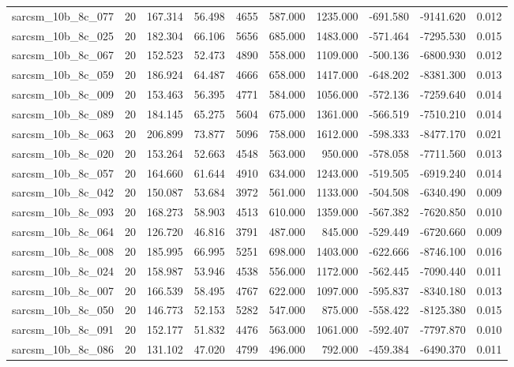 \begin{tabular}{lrrrrrrrrr}
sarcsm\_10b\_8c\_077 & 20 & 167.314 & 56.498 & 4655 & 587.000 & 1235.000 & -691.580 & -9141.620 & 0.012 \\
sarcsm\_10b\_8c\_025 & 20 & 182.304 & 66.106 & 5656 & 685.000 & 1483.000 & -571.464 & -7295.530 & 0.015 \\
sarcsm\_10b\_8c\_067 & 20 & 152.523 & 52.473 & 4890 & 558.000 & 1109.000 & -500.136 & -6800.930 & 0.012 \\
sarcsm\_10b\_8c\_059 & 20 & 186.924 & 64.487 & 4666 & 658.000 & 1417.000 & -648.202 & -8381.300 & 0.013 \\
sarcsm\_10b\_8c\_009 & 20 & 153.463 & 56.395 & 4771 & 584.000 & 1056.000 & -572.136 & -7259.640 & 0.014 \\
sarcsm\_10b\_8c\_089 & 20 & 184.145 & 65.275 & 5604 & 675.000 & 1361.000 & -566.519 & -7510.210 & 0.014 \\
sarcsm\_10b\_8c\_063 & 20 & 206.899 & 73.877 & 5096 & 758.000 & 1612.000 & -598.333 & -8477.170 & 0.021 \\
sarcsm\_10b\_8c\_020 & 20 & 153.264 & 52.663 & 4548 & 563.000 & 950.000 & -578.058 & -7711.560 & 0.013 \\
sarcsm\_10b\_8c\_057 & 20 & 164.660 & 61.644 & 4910 & 634.000 & 1243.000 & -519.505 & -6919.240 & 0.014 \\
sarcsm\_10b\_8c\_042 & 20 & 150.087 & 53.684 & 3972 & 561.000 & 1133.000 & -504.508 & -6340.490 & 0.009 \\
sarcsm\_10b\_8c\_093 & 20 & 168.273 & 58.903 & 4513 & 610.000 & 1359.000 & -567.382 & -7620.850 & 0.010 \\
sarcsm\_10b\_8c\_064 & 20 & 126.720 & 46.816 & 3791 & 487.000 & 845.000 & -529.449 & -6720.660 & 0.009 \\
sarcsm\_10b\_8c\_008 & 20 & 185.995 & 66.995 & 5251 & 698.000 & 1403.000 & -622.666 & -8746.100 & 0.016 \\
sarcsm\_10b\_8c\_024 & 20 & 158.987 & 53.946 & 4538 & 556.000 & 1172.000 & -562.445 & -7090.440 & 0.011 \\
sarcsm\_10b\_8c\_007 & 20 & 166.539 & 58.495 & 4767 & 622.000 & 1097.000 & -595.837 & -8340.180 & 0.013 \\
sarcsm\_10b\_8c\_050 & 20 & 146.773 & 52.153 & 5282 & 547.000 & 875.000 & -558.422 & -8125.380 & 0.015 \\
sarcsm\_10b\_8c\_091 & 20 & 152.177 & 51.832 & 4476 & 563.000 & 1061.000 & -592.407 & -7797.870 & 0.010 \\
sarcsm\_10b\_8c\_086 & 20 & 131.102 & 47.020 & 4799 & 496.000 & 792.000 & -459.384 & -6490.370 & 0.011 \\

\end{tabular}
